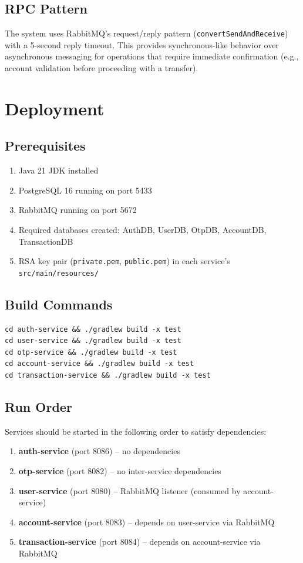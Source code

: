 \documentclass[12pt,a4paper]{report}
\begin{document}
\section{RPC Pattern}
The system uses RabbitMQ's request/reply pattern (\texttt{convertSendAndReceive}) with a 5-second reply timeout. This provides synchronous-like behavior over asynchronous messaging for operations that require immediate confirmation (e.g., account validation before proceeding with a transfer).

\chapter{Deployment}

\section{Prerequisites}
\begin{enumerate}
    \item Java 21 JDK installed
    \item PostgreSQL 16 running on port 5433
    \item RabbitMQ running on port 5672
    \item Required databases created: AuthDB, UserDB, OtpDB, AccountDB, TransactionDB
    \item RSA key pair (\texttt{private.pem}, \texttt{public.pem}) in each service's \texttt{src/main/resources/}
\end{enumerate}

\section{Build Commands}
\begin{lstlisting}[style=propstyle, caption={Building All Services}]
cd auth-service && ./gradlew build -x test
cd user-service && ./gradlew build -x test
cd otp-service && ./gradlew build -x test
cd account-service && ./gradlew build -x test
cd transaction-service && ./gradlew build -x test
\end{lstlisting}

\section{Run Order}
Services should be started in the following order to satisfy dependencies:

\begin{enumerate}
    \item \textbf{auth-service} (port 8086) -- no dependencies
    \item \textbf{otp-service} (port 8082) -- no inter-service dependencies
    \item \textbf{user-service} (port 8080) -- RabbitMQ listener (consumed by account-service)
    \item \textbf{account-service} (port 8083) -- depends on user-service via RabbitMQ
    \item \textbf{transaction-service} (port 8084) -- depends on account-service via RabbitMQ
\end{enumerate}
\end{document}
